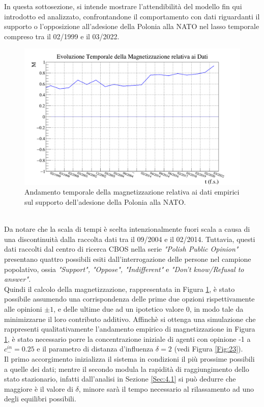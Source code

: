 \documentclass[letterpaper,10pt]{article}
\begin{document}
In questa sottosezione, si intende mostrare l'attendibilità del modello fin qui introdotto ed analizzato, confrontandone il comportamento con dati riguardanti il supporto o l'opposizione all'adesione della Polonia alla NATO nel lasso temporale compreso tra il 02/1999 e il 03/2022.
\begin{figure}[hb!]
\centering
\includegraphics[width = 0.9\linewidth]{Immagini/poland_magnetization_graph.png}
\caption{Andamento temporale della magnetizzazione relativa ai dati empirici sul supporto dell'adesione della Polonia alla NATO. }
\label{Fig:22}
\end{figure}\\
Da notare che la scala di tempi è scelta intenzionalmente fuori scala a causa di una discontinuità dalla raccolta dati tra il 09/2004 e il 02/2014. Tuttavia, questi dati raccolti dal centro di ricerca CBOS \cite{cbos} nella serie \textit{"Polish Public Opinion"} presentano quattro possibili esiti dall'interrogazione delle persone nel campione popolativo, ossia \textit{"Support", "Oppose", "Indifferent"} e \textit{"Don't know/Refusal to answer".}
\\Quindi il calcolo della magnetizzazione, rappresentata in Figura \ref{Fig:22}, è stato possibile assumendo una corrispondenza delle prime due opzioni rispettivamente alle opinioni $\pm1$, e delle ultime due ad un ipotetico valore 0, in modo tale da minimizzarne il loro contributo additivo. Affinchè si ottenga una simulazione che rappresenti qualitativamente l'andamento empirico di magnetizzazione in Figura \ref{Fig:22}, è stato necessario porre la concentrazione iniziale di agenti con opinione -1 a $c_{-}^{in}=0.25$ e il parametro di distanza d'influenza $\delta=2$ (vedi Figura \ref{Fig:23}).
\\ Il primo accorgimento inizializza il sistema in condizioni il più prossime possibili a quelle dei dati; mentre il secondo modula la rapidità di raggiungimento dello stato stazionario, infatti dall'analisi in Sezione \ref{Sec:4.1} si può dedurre che maggiore è il valore di $\delta$, minore sarà il tempo necessario al rilassamento ad uno degli equilibri possibili.
\end{document}
